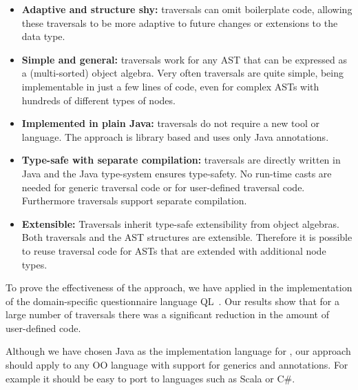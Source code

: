 \begin{itemize}

\item {\bf Adaptive and structure shy:} \name traversals can omit
  boilerplate code, allowing these traversals to be more adaptive to
  future changes or extensions to the data type.

\item {\bf Simple and general:} \name traversals work for any
  AST that can be expressed as a (multi-sorted) object
  algebra. Very often traversals are quite simple, being
  implementable in just a few lines of code, even for complex
  ASTs with hundreds of different types of nodes.

\item {\bf Implemented in plain Java:} \name traversals do not require
  a new tool or language. The approach is library based and uses only
  Java annotations.

\item {\bf Type-safe with separate compilation:} \name traversals are directly written in Java
  and the Java type-system ensures type-safety. No run-time casts are
  needed for generic traversal code or for user-defined traversal
  code. Furthermore \name traversals support separate compilation.

\item {\bf Extensible:} Traversals inherit type-safe
  extensibility from object algebras. Both traversals and the AST structures
  are extensible. Therefore it is possible to
  reuse traversal code for ASTs that are extended with additional
  node types.


\end{itemize}

To prove the effectiveness of the approach, we have applied \name
in the implementation of the domain-specific questionnaire
language QL~\cite{gouseti14extensible}.
Our results show that for a large number of traversals
there was a significant reduction in the amount of user-defined code.

Although we have chosen Java as the implementation language for \Name,
our approach should apply to any OO language with support for generics
and annotations. For example it should be easy to port \name to
languages such as Scala or C\#.

